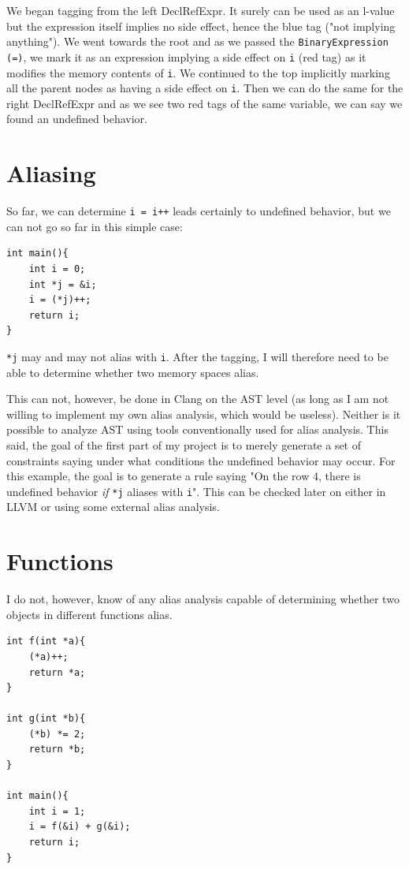 We began tagging from the left DeclRefExpr. It surely can be used as an l-value but the expression itself implies no side effect, hence the blue tag ("not implying anything"). We went towards the root and as we passed the \verb|BinaryExpression (=)|, we mark it as an expression implying a side effect on \verb|i| (red tag) as it modifies the memory contents of \verb|i|. We continued to the top implicitly marking all the parent nodes as having a side effect on \verb|i|. Then we can do the same for the right DeclRefExpr and as we see two red tags of the same variable, we can say we found an undefined behavior.

\section{Aliasing}
So far, we can determine \verb|i = i++| leads certainly to undefined behavior, but we can not go so far in this simple case:

\begin{lstlisting}
int main(){
	int i = 0;
	int *j = &i;
	i = (*j)++;
    return i;
}
\end{lstlisting}

\verb|*j| may and may not alias with \verb|i|. After the tagging, I will therefore need to be able to determine whether two memory spaces alias.

This can not, however, be done in Clang on the AST level (as long as I am not willing to implement my own alias analysis, which would be useless). Neither is it possible to analyze AST using tools conventionally used for alias analysis. This said, the goal of the first part of my project is to merely generate a set of constraints saying under what conditions the undefined behavior may occur. For this example, the goal is to generate a rule saying "On the row 4, there is undefined behavior \emph{if} \verb|*j| aliases with \verb|i|". This can be checked later on either in LLVM or using some external alias analysis.

\section{Functions}
I do not, however, know of any alias analysis capable of determining whether two objects in different functions alias.

\begin{lstlisting}
int f(int *a){
    (*a)++;
    return *a;
}

int g(int *b){
    (*b) *= 2;
    return *b;
}

int main(){
    int i = 1;
    i = f(&i) + g(&i);
    return i;
}
\end{lstlisting}

